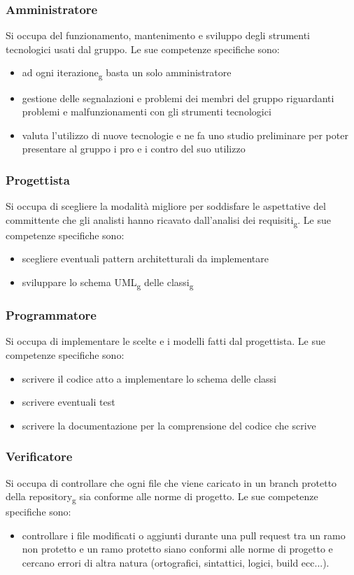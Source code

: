 \subsubsection{Amministratore}
Si occupa del funzionamento, mantenimento e sviluppo degli strumenti tecnologici usati dal gruppo. Le sue competenze specifiche sono:
\begin{itemize}
	\item ad ogni iterazione\textsubscript{g} basta un solo amministratore
	\item gestione delle segnalazioni e problemi dei membri del gruppo riguardanti problemi e malfunzionamenti con gli strumenti tecnologici
	\item valuta l'utilizzo di nuove tecnologie e ne fa uno studio preliminare per poter presentare al gruppo i pro e i contro del suo utilizzo
\end{itemize}

\subsubsection{Progettista}
Si occupa di scegliere la modalità migliore per soddisfare le aspettative del committente che gli analisti hanno ricavato dall'analisi dei requisiti\textsubscript{g}. Le sue competenze specifiche sono:
\begin{itemize}
	\item scegliere eventuali pattern architetturali da implementare
	\item sviluppare lo schema UML\textsubscript{g} delle classi\textsubscript{g}
\end{itemize}

\subsubsection{Programmatore}
Si occupa di implementare le scelte e i modelli fatti dal progettista. Le sue competenze specifiche sono:
\begin{itemize}
	\item scrivere il codice atto a implementare lo schema delle classi
	\item scrivere eventuali test
	\item scrivere la documentazione per la comprensione del codice che scrive
\end{itemize}

\subsubsection{Verificatore}
Si occupa di controllare che ogni file che viene caricato in un branch protetto della repository\textsubscript{g} sia conforme alle norme di progetto. Le sue competenze specifiche sono:
\begin{itemize}
	\item controllare i file modificati o aggiunti durante una pull request tra un ramo non protetto e un ramo protetto siano conformi alle norme di progetto e cercano errori di altra natura (ortografici, sintattici, logici, build ecc...).
\end{itemize}



